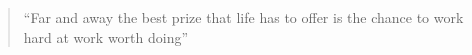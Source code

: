 \documentclass[10pt,a4paper,ragged2e,withhyper]{altacv}
\begin{document}
\begin{paracol}{2}



\nocite{*}  






\switchcolumn


\begin{quote}
``Far and away the best prize that life has to offer is the chance to work hard at work worth doing''
\end{quote}

%





\\

\divider\smallskip



\end{paracol}
\end{document}
